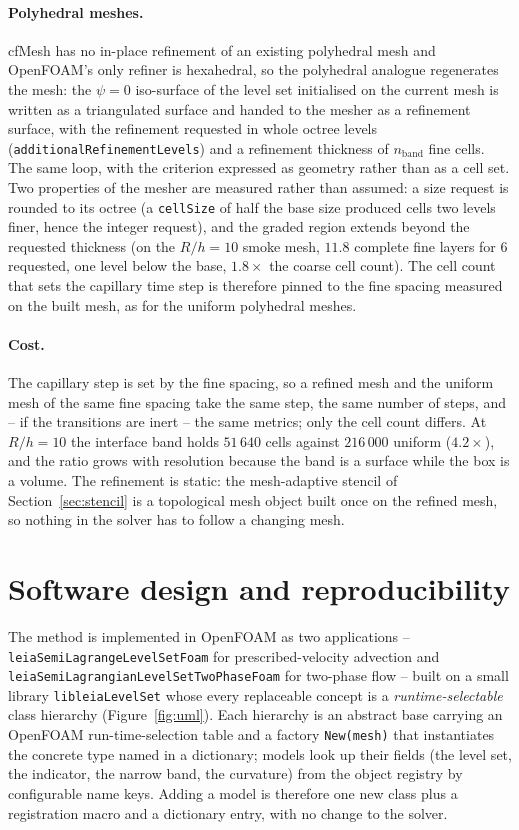 \documentclass[preprint,3p,11pt]{elsarticle}
\begin{document}
\paragraph{Polyhedral meshes.}
cfMesh has no in-place refinement of an existing polyhedral mesh and OpenFOAM's only
refiner is hexahedral, so the polyhedral analogue regenerates the mesh: the $\psi=0$
iso-surface of the level set initialised on the current mesh is written as a triangulated
surface and handed to the mesher as a refinement surface, with the refinement requested
in whole octree levels (\texttt{additionalRefinementLevels}) and a refinement thickness of
$n_{\mathrm{band}}$ fine cells. The same loop, with the criterion expressed as geometry
rather than as a cell set. Two properties of the mesher are measured rather than assumed:
a size request is rounded to its octree (a \texttt{cellSize} of half the base size
produced cells two levels finer, hence the integer request), and the graded region
extends beyond the requested thickness (on the $R/h=10$ smoke mesh, $11.8$ complete fine
layers for $6$ requested, one level below the base, $1.8\times$ the coarse cell count). The
cell count that sets the capillary time step is therefore pinned to the fine spacing
measured on the built mesh, as for the uniform polyhedral meshes.

\paragraph{Cost.}
The capillary step is set by the fine spacing, so a refined mesh and the uniform mesh of
the same fine spacing take the same step, the same number of steps, and -- if the
transitions are inert -- the same metrics; only the cell count differs. At $R/h=10$ the
interface band holds $51\,640$ cells against $216\,000$ uniform ($4.2\times$), and the
ratio grows with resolution because the band is a surface while the box is a volume.
The refinement is static: the mesh-adaptive stencil of Section~\ref{sec:stencil} is a
topological mesh object built once on the refined mesh, so nothing in the solver has to
follow a changing mesh.

\section{Software design and reproducibility}
\label{sec:software}
The method is implemented in OpenFOAM as two applications --
\texttt{leiaSemiLagrangeLevelSetFoam} for prescribed-velocity advection and
\texttt{leiaSemiLagrangianLevelSetTwoPhaseFoam} for two-phase flow -- built on a small
library \texttt{libleiaLevelSet} whose every replaceable concept is a
\emph{runtime-selectable} class hierarchy (Figure~\ref{fig:uml}). Each hierarchy is an
abstract base carrying an OpenFOAM run-time-selection table and a factory
\texttt{New(mesh)} that instantiates the concrete type named in a dictionary; models look
up their fields (the level set, the indicator, the narrow band, the curvature) from the
object registry by configurable name keys. Adding a model is therefore one new class plus
a registration macro and a dictionary entry, with no change to the solver.
\end{document}
